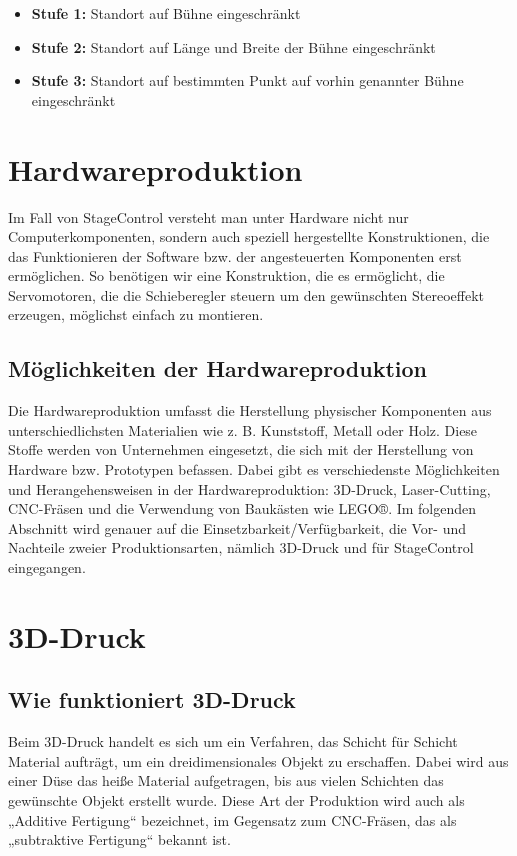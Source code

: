 \begin{itemize}
	\item \textbf{Stufe 1: }Standort auf Bühne eingeschränkt
	\item \textbf{Stufe 2: }Standort auf Länge und Breite der Bühne eingeschränkt
	\item \textbf{Stufe 3: }Standort auf bestimmten Punkt auf vorhin genannter Bühne eingeschränkt
\end{itemize}

\section{Hardwareproduktion }
Im Fall von StageControl versteht man unter Hardware nicht nur Computerkomponenten, sondern auch speziell hergestellte Konstruktionen, die das Funktionieren der Software bzw. der angesteuerten Komponenten erst ermöglichen. So benötigen wir eine Konstruktion, die es ermöglicht, die Servomotoren, die die Schieberegler steuern um den gewünschten Stereoeffekt erzeugen, möglichst einfach zu montieren. 

\subsection{Möglichkeiten der Hardwareproduktion}
Die Hardwareproduktion umfasst die Herstellung physischer Komponenten aus unterschiedlichsten Materialien wie z. B. Kunststoff, Metall oder Holz. Diese Stoffe werden von Unternehmen eingesetzt, die sich mit der Herstellung von Hardware bzw. Prototypen befassen. Dabei gibt es verschiedenste Möglichkeiten und Herangehensweisen in der Hardwareproduktion: 3D-Druck, Laser-Cutting, CNC-Fräsen und die Verwendung von Baukästen wie LEGO®. Im folgenden Abschnitt wird genauer auf die Einsetzbarkeit/Verfügbarkeit, die Vor- und Nachteile zweier Produktionsarten, nämlich 3D-Druck und  für StageControl eingegangen.

\section{3D-Druck}
\subsection{Wie funktioniert 3D-Druck}
Beim 3D-Druck handelt es sich um ein Verfahren, das Schicht für Schicht Material aufträgt, um ein dreidimensionales Objekt zu erschaffen. Dabei wird aus einer Düse das heiße Material aufgetragen, bis aus vielen Schichten das gewünschte Objekt erstellt wurde. Diese Art der Produktion wird auch als „Additive Fertigung“ bezeichnet, im Gegensatz zum CNC-Fräsen, das als „subtraktive Fertigung“ bekannt ist.

